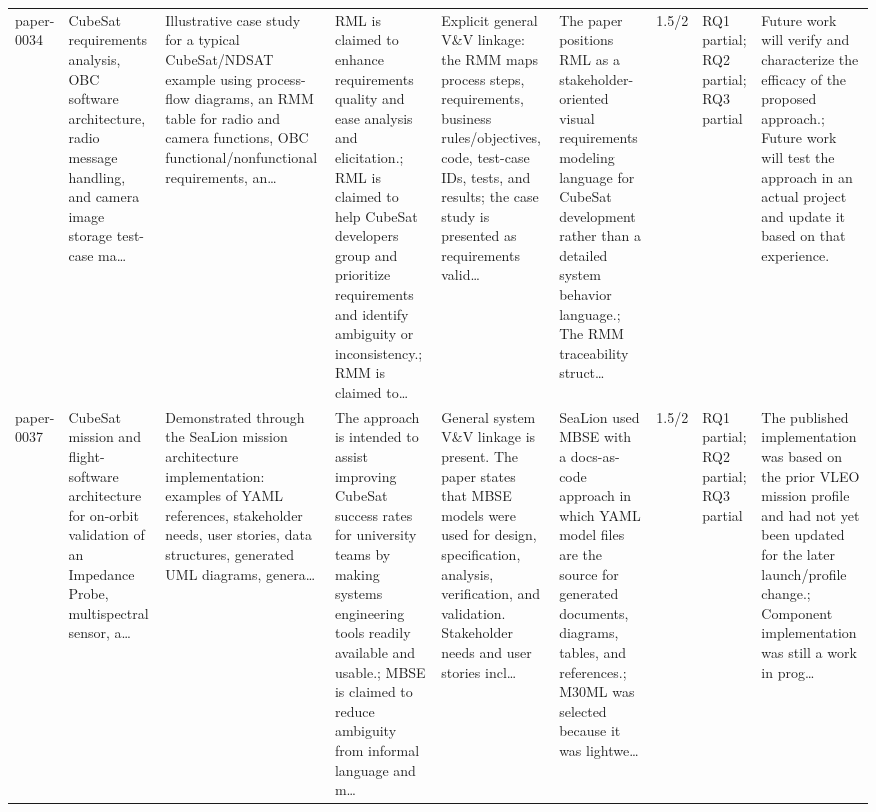 \documentclass[10pt]{article}
\begin{document}
\begin{landscape}
\begin{longtable}{p{1.0cm}p{2.4cm}p{3.1cm}p{3.7cm}p{3.4cm}p{3.1cm}p{1.0cm}p{1.8cm}p{3.4cm}}
paper-0034 & CubeSat requirements analysis, OBC software architecture, radio message handling, and camera image storage test-case ma… & Illustrative case study for a typical CubeSat/NDSAT example using process-flow diagrams, an RMM table for radio and camera functions, OBC functional/nonfunctional requirements, an… & RML is claimed to enhance requirements quality and ease analysis and elicitation.; RML is claimed to help CubeSat developers group and prioritize requirements and identify ambiguity or inconsistency.; RMM is claimed to… & Explicit general V\&V linkage: the RMM maps process steps, requirements, business rules/objectives, code, test-case IDs, tests, and results; the case study is presented as requirements valid… & The paper positions RML as a stakeholder-oriented visual requirements modeling language for CubeSat development rather than a detailed system behavior language.; The RMM traceability struct… & 1.5/2 & RQ1 partial; RQ2 partial; RQ3 partial & Future work will verify and characterize the efficacy of the proposed approach.; Future work will test the approach in an actual project and update it based on that experience. \\
paper-0037 & CubeSat mission and flight-software architecture for on-orbit validation of an Impedance Probe, multispectral sensor, a… & Demonstrated through the SeaLion mission architecture implementation: examples of YAML references, stakeholder needs, user stories, data structures, generated UML diagrams, genera… & The approach is intended to assist improving CubeSat success rates for university teams by making systems engineering tools readily available and usable.; MBSE is claimed to reduce ambiguity from informal language and m… & General system V\&V linkage is present. The paper states that MBSE models were used for design, specification, analysis, verification, and validation. Stakeholder needs and user stories incl… & SeaLion used MBSE with a docs-as-code approach in which YAML model files are the source for generated documents, diagrams, tables, and references.; M30ML was selected because it was lightwe… & 1.5/2 & RQ1 partial; RQ2 partial; RQ3 partial & The published implementation was based on the prior VLEO mission profile and had not yet been updated for the later launch/profile change.; Component implementation was still a work in prog… \\

\end{longtable}
\end{landscape}
\end{document}
